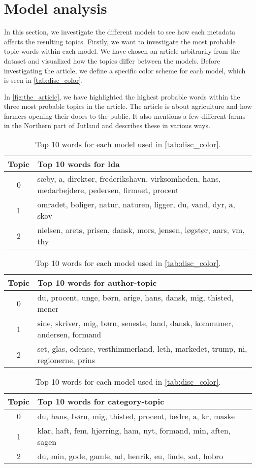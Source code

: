 \section{Model analysis}\label{sec:discussion}
In this section, we investigate the different models to see how each metadata affects the resulting topics.
Firstly, we want to investigate the most probable topic words within each model.
We have chosen an article arbitrarily from the dataset and visualized how the topics differ between the models. 
Before investigating the article, we define a specific color scheme for each model, which is seen in \autoref{tab:disc_color}.

In \autoref{fig:the_article}, we have highlighted the highest probable words within the three most probable topics in the article.
The article is about agriculture and how farmers opening their doors to the public. 
It also mentions a few different farms in the Northern part of Jutland and describes these in various ways.

\begin{table}
	\caption{Top 10 words for each model used in \autoref{tab:disc_color}.}
	\label{tab:top_words_three_models}
	\begin{tabular}{c|p{}}
		Topic & Top 10 words for \gls{lda} \\
		\midrule
		0 & sæby, a, direktør, frederikshavn, virksomheden, hans, medarbejdere, pedersen, firmaet, procent \\
		1 & omradet, boliger, natur, naturen, ligger, du, vand, dyr, a, skov \\
		2 & nielsen, arets, prisen, dansk, mors, jensen, løgstør, aars, vm, thy \\
	\end{tabular}
	\begin{tabular}{c|p{}}
		\midrule
		Topic & Top 10 words for author-topic \\
		\midrule
		0 & du, procent, unge, børn, arige, hans, dansk, mig, thisted, mener\\
		1 & sine, skriver, mig, børn, seneste, land, dansk, kommuner, andersen, formand \\
		2 & set, glas, odense, vesthimmerland, leth, markedet, trump, ni, regionerne, prins\\
	\end{tabular}
	\begin{tabular}{c|p{}}
		\midrule
		Topic & Top 10 words for category-topic \\
		\midrule
		0 & du, hans, børn, mig, thisted, procent, bedre, a, kr, maske \\
		1 & klar, haft, fem, hjørring, ham, nyt, formand, min, aften, sagen\\
		2 & du, min, gode, gamle, ad, henrik, eu, finde, sat, hobro\\
	\end{tabular}
\end{table}

